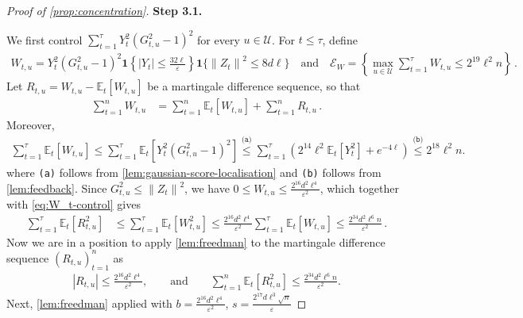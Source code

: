 \documentclass[11pt]{article}
\newcommand{\proofstepinline}[1]{%
    {\sffamily\bfseries\color{blue!55!black}Step #1.}\enspace
}
\newcommand{\reason}[1]{\texttt{(#1)}}
\newcommand{\explan}[2]{\stackrel{\reason{#2}}{#1}}
\newcommand{\E}{\mathbb E}
\newcommand{\1}{\mathbf 1}
\newcommand{\eps}{\varepsilon}
\newcommand{\norm}[1]{\left\lVert #1\right\rVert}
\begin{document}
\begin{proof}[Proof of \cref{prop:concentration}]
    \proofstepinline{3.1}
    We first control
    $\sum_{t=1}^{\tau} Y_t^2(G_{t,u}^2-1)^2$
    for every $u\in\mathcal U$.
    For $t\leq \tau$, define
    \begin{align}
        W_{t,u}=Y_t^2(G_{t,u}^2-1)^2 \1\left\{|Y_t|\leq\frac{32\ell}{\eps}\right\}\1\{\norm{Z_t}^2\leq 8d\ell\}
        \quad\text{and}\quad
        \mathcal{E}_W
        =
        \left\{
        \max_{u\in\mathcal U}
        \sum_{t=1}^\tau W_{t,u}
        \leq
        2^{19}\ell^2n
        \right\}\,.
    \end{align}
    Let $R_{t,u}=W_{t,u}-\E_t[W_{t,u}]$ be a martingale difference sequence, so that
    \begin{align}
        \sum_{t=1}^nW_{t,u}
         & =
        \sum_{t=1}^n\E_t[W_{t,u}]
        +
        \sum_{t=1}^nR_{t,u}\,.
        \label{eq:W_t-upperbound}
    \end{align}
    Moreover,
    \begin{align}
        \sum_{t=1}^{\tau}\E_t[W_{t,u}]
        \leq
        \sum_{t=1}^\tau
        \E_t[Y_t^2(G_{t,u}^2-1)^2]
        \explan{\leq}{a}
        \sum_{t=1}^{\tau}
        \left(
        2^{14} \ell^2\E_t[Y_t^2]+e^{-4\ell}
        \right)
        \explan{\leq}{b}
        2^{18} \ell^2n.
        \label{eq:W_t-control}
    \end{align}
    where \reason{a} follows from
    \cref{lem:gaussian-score-localisation}
    and \reason{b} follows from \cref{lem:feedback}.
    Since $G_{t,u}^2\leq\norm{Z_t}^2$, we have
    $0\leq W_{t,u} \leq \frac{2^{16} d^2 \ell^4}{\eps^2}$,
    which together with \eqref{eq:W_t-control} gives
    \begin{align}
        \sum_{t=1}^\tau
        \E_t[R_{t,u}^2]
         & \leq
        \sum_{t=1}^\tau\E_t[W_{t,u}^2]
        \leq
        \frac{2^{16} d^2 \ell^4}{\eps^2} \sum_{t=1}^{\tau}\E_t[W_{t,u}]
        \leq
        \frac{2^{34} d^2 \ell^6 n}{\eps^2}\,.
    \end{align}
    Now we are in a position to apply \cref{lem:freedman} to the martingale difference sequence $(R_{t,u})_{t=1}^n$ as
    \begin{align}
        |R_{t,u}|
        \leq
        \frac{2^{16} d^2 \ell^4}{\eps^2},
        \qquad \text{and}\qquad
        \sum_{t=1}^n\E_t[R_{t,u}^2]
        \leq
        \frac{2^{34} d^2 \ell^6 n}{\eps^2}.
    \end{align}
    Next, \cref{lem:freedman} applied with $b=\frac{2^{16} d^2 \ell^4}{\eps^2}$, $s=\frac{2^{17} d \ell^3 \sqrt n}{\eps}$

\end{proof}
\end{document}
